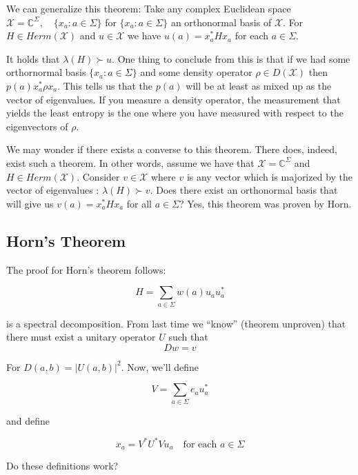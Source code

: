 \documentclass{article}
\begin{document}
        We can generalize this theorem: Take any complex Euclidean space
        $\mathcal{X} = \mathbb{C}^\Sigma, \quad \{ x_a : a \in \Sigma \}$ for
        $\{x_a: a \in \Sigma \}$ an orthonormal basis of $\mathcal{X}$. For $H
        \in Herm(\mathcal{X})$ and $u \in \mathcal{X}$ we have $u(a) = x_a^* H
        x_a$ for each $a \in \Sigma$.

        It holds that $\lambda(H) \succ u$. One thing to conclude from this is
        that if we had some orthornormal basis $\{x_a : a \in \Sigma\}$ and some
        density operator $\rho \in D(\mathcal{X})$ then $p(a)  x_a^* \rho x_a$.
        This tells us that the $p(a)$ will be at least as mixed up as the vector
        of eigenvalues. If you measure a density operator, the measurement that
        yields the least entropy is the one where you have measured with respect
        to the eigenvectors of $\rho$.

        We may wonder if there exists a converse to this theorem. There does,
        indeed, exist such a theorem. In other words, assume we have that
        $\mathcal{X} = \mathbb{C}^\Sigma$ and $H \in Herm(\mathcal{X})$.
        Consider $v \in \mathcal{X}$ where $v$ is any vector which is majorized
        by the vector of eigenvalues : $\lambda(H) \succ v$. Does there exist an
        orthonormal basis that will give us $v(a) = x_a^* H x_a$ for all $a \in
        \Sigma$? Yes, this theorem was proven by Horn.

        \subsection*{Horn's Theorem}
        The proof for Horn's theorem follows:

        \[ 
                H = \sum_{a \in \Sigma} w(a) u_a u_a^* 
        \]
        
        is a spectral decomposition.  From last time we ``know'' (theorem
        unproven) that there must exist a unitary operator $U$ such that
        \[ 
            Dw = v 
        \]
        
        For $D(a,b) = \left| U(a,b) \right|^2$. Now, we'll define 

        \[ 
                V = \sum_{a \in \Sigma} e_a u_a^* 
        \]
        
        and define 

        \[ 
            x_a = V^*U^*V u_a \quad \text{for each $a \in \Sigma$}
        \]
        
        Do these definitions work?
\end{document}
